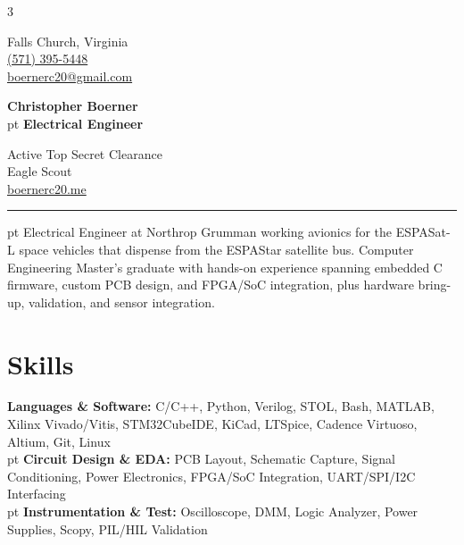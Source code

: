 \documentclass[9pt, letterpaper]{extarticle}
\newenvironment{threecolentry}[3][]{
    \onecolentry
    \def\thirdColumn{#3}
    \setcolumnwidth{, \fill, \fill, \fill}
    \begin{paracol}{3}
    {\raggedright #2} \switchcolumn
    \begin{center}  %
}{
    \end{center}
    \switchcolumn \raggedleft \thirdColumn
    \end{paracol}
    \endonecolentry
} %
\let\hrefWithoutArrow\href
\begin{document}
    \newcommand{\AND}{\unskip
        \cleaders\copy\ANDbox\hskip\wd\ANDbox
        \ignorespaces
    }
    \newsavebox\ANDbox
    \sbox\ANDbox{$|$}

    \begin{threecolentry}
        {
            Falls Church, Virginia\\
            \hrefWithoutArrow{tel:+1-571-395-5448}{(571) 395-5448}\\
            \hrefWithoutArrow{mailto:boernerc20@gmail.com}{boernerc20@gmail.com}
        }
        {
            Active Top Secret Clearance \\
            Eagle Scout \\
            \hrefWithoutArrow{https://www.boernerc20.me}{boernerc20.me} \\
        }
        {
            \Huge\textbf{{Christopher Boerner}}\\
             pt%
            \Large{\textbf{Electrical Engineer}}
        }
    \end{threecolentry}
    \hrule
     pt%
    Electrical Engineer at Northrop Grumman working avionics for the ESPASat-L space vehicles that dispense from the ESPAStar satellite bus. Computer Engineering Master's graduate with hands-on experience spanning embedded C firmware, custom PCB design, and FPGA/SoC integration, plus hardware bring-up, validation, and sensor integration.

    \section{Skills}
    \textbf{Languages \& Software: }C/C++, Python, Verilog, STOL, Bash, MATLAB, Xilinx Vivado/Vitis, STM32CubeIDE, KiCad, LTSpice, Cadence Virtuoso, Altium, Git, Linux\\
     pt%
    \textbf{Circuit Design \& EDA: }PCB Layout, Schematic Capture, Signal Conditioning, Power Electronics, FPGA/SoC Integration, UART/SPI/I2C Interfacing\\
     pt%
    \textbf{Instrumentation \& Test: }Oscilloscope, DMM, Logic Analyzer, Power Supplies, Scopy, PIL/HIL Validation

\end{document}
